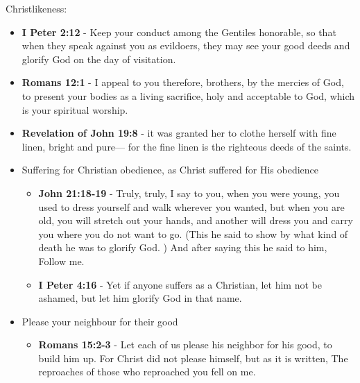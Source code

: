 \documentclass[11pt]{article}
\begin{document}
Christlikeness:
\begin{itemize}
\item \textbf{I Peter 2:12} - Keep your conduct among the Gentiles honorable, so that when they speak against you as evildoers, they may see your good deeds and glorify God on the day of visitation.

\item \textbf{Romans 12:1} - I appeal to you therefore, brothers, by the mercies of God, to present your bodies as a living sacrifice, holy and acceptable to God, which is your spiritual worship.

\item \textbf{Revelation of John 19:8} - it was granted her to clothe herself with fine linen, bright and pure— for the fine linen is the righteous deeds of the saints.

\item Suffering for Christian obedience, as Christ suffered for His obedience
\begin{itemize}
\item \textbf{John 21:18-19} - Truly, truly, I say to you, when you were young, you used to dress yourself and walk wherever you wanted, but when you are old, you will stretch out your hands, and another will dress you and carry you where you do not want to go. (This he said to show by what kind of death he was to glorify God. ) And after saying this he said to him, Follow me.
\item \textbf{I Peter 4:16} - Yet if anyone suffers as a Christian, let him not be ashamed, but let him glorify God in that name.
\end{itemize}

\item Please your neighbour for their good
\begin{itemize}
\item \textbf{Romans 15:2-3} - Let each of us please his neighbor for his good, to build him up. For Christ did not please himself, but as it is written, The reproaches of those who reproached you fell on me.
\end{itemize}


\end{itemize}
\end{document}
